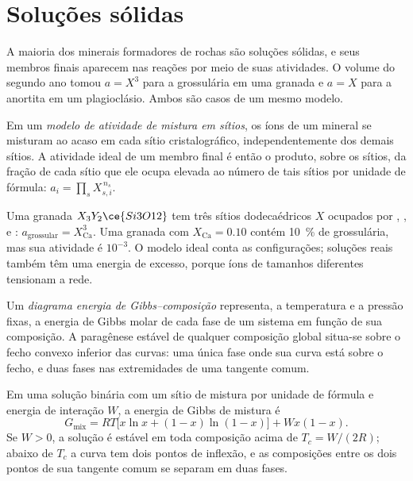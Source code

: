 \section{Soluções sólidas}\label{sec:b3:petrological-thermodynamics:solutions}

A maioria dos minerais formadores de rochas são soluções sólidas, e seus membros finais
aparecem nas reações por meio de suas atividades. O volume do segundo ano tomou $a = X^3$ para
a grossulária em uma granada e $a = X$ para a anortita em um plagioclásio.
Ambos são casos de um mesmo modelo.

\begin{definition}\label{def:b3:petrological-thermodynamics:site-mixing}
Em um \emph{modelo de atividade de mistura em sítios}, os
íons de um mineral se misturam ao acaso em cada sítio cristalográfico, independentemente
dos demais sítios. A atividade ideal de um membro final é então o produto, sobre os
sítios, da fração de cada sítio que ele ocupa elevada ao número de
tais sítios por unidade de fórmula: $a_i = \prod_s X_{s,i}^{\,n_s}$.
\end{definition}

Uma granada $X_3Y_2\ce{Si3O12}$ tem três sítios dodecaédricos $X$ ocupados por
, ,  e : $a_{\text{grossular}} =
X_{\text{Ca}}^3$. Uma granada com $X_{\text{Ca}} = 0.10$ contém
\qty{10}{\percent} de grossulária, mas sua atividade é $10^{-3}$. O
modelo ideal conta as configurações; soluções reais também têm uma energia
de excesso, porque íons de tamanhos diferentes tensionam a rede.

\begin{definition}\label{def:b3:petrological-thermodynamics:gx}
Um \emph{diagrama energia de Gibbs--composição}
representa, a temperatura e a pressão fixas, a energia de Gibbs molar de
cada fase de um sistema em função de sua composição. A paragênese estável de qualquer
composição global situa-se sobre o fecho convexo inferior das curvas: uma única fase
onde sua curva está sobre o fecho, e duas fases nas extremidades de uma tangente comum.
\end{definition}

\begin{proposition}\label{prop:b3:petrological-thermodynamics:regular}
Em uma solução binária com um sítio de mistura por unidade de fórmula e
energia de interação $W$, a energia de Gibbs de mistura é
  \[
  G_{\text{mix}} = RT\bigl[x\ln x + (1 - x)\ln(1 - x)\bigr] + Wx(1 - x).
\]
Se $W > 0$, a solução é estável em toda composição acima de $T_c =
W/(2R)$; abaixo de $T_c$ a curva tem dois pontos de inflexão, e as composições
entre os dois pontos de sua tangente comum se separam em duas fases.
\end{proposition}


